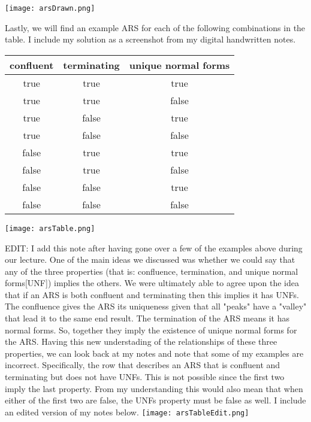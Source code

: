 \documentclass{article}
\theoremstyle{theorem}
\theoremstyle{definition}
\theoremstyle{remark}
\begin{document}
\texttt{[image: arsDrawn.png]}

Lastly, we will find an example ARS for each of the following combinations in the table. I include my solution as a screenshot from my digital handwritten notes. 
\begin{center}
  \begin{tabular}{||c c c ||} 
   \hline
   confluent & terminating & unique normal forms \\ [0.5ex] 
   \hline\hline
   true & true & true \\ 
   \hline
   true & true & false \\
   \hline
   true & false & true \\
   \hline
   true & false & false \\
   \hline
   false & true & true \\
   \hline
   false & true & false \\
   \hline
   false & false & true \\
   \hline
   false & false & false \\ [1ex] 
   \hline
  \end{tabular}
\end{center}
\texttt{[image: arsTable.png]}

EDIT: I add this note after having gone over a few of the examples above during our lecture. One of the main ideas we discussed was whether we could say that any of the three properties (that is: confluence, termination, and unique normal forms[UNF]) 
implies the others. We were ultimately able to agree upon the idea that if an ARS is both confluent and terminating then this implies it has UNFs. The confluence gives the ARS its uniqueness given that all "peaks" have a "valley" that lead it to the same 
end result. The termination of the ARS means it has normal forms. So, together they imply the existence of unique normal forms for the ARS. Having this new understading of the relationships of these three properties, we can look back at my notes and 
note that some of my examples are incorrect. Specifically, the row that describes an ARS that is confluent and terminating but does not have UNFs. This is not possible since the first two imply the last property. From my understanding
this would also mean that when either of the first two are false, the UNFs property must be false as well. I include an edited version of my notes below.
\texttt{[image: arsTableEdit.png]}
\end{document}
